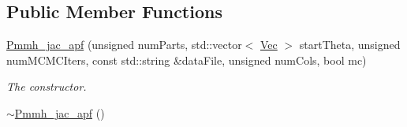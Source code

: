 \subsection*{Public Member Functions}
\begin{DoxyCompactItemize}
\item 
\hyperlink{classPmmh__jac__apf_ac195b6fc79a2d91620ceb077e752c4a8}{Pmmh\+\_\+jac\+\_\+apf} (unsigned num\+Parts, std\+::vector$<$ \hyperlink{pmfs_8h_a4c7df05c6f5e8a0d15ae14bcdbc07152}{Vec} $>$ start\+Theta, unsigned num\+M\+C\+M\+C\+Iters, const std\+::string \&data\+File, unsigned num\+Cols, bool mc)
\begin{DoxyCompactList}\small\item\em The constructor. \end{DoxyCompactList}\item 
\hyperlink{classPmmh__jac__apf_afbe2594fe7e40914ac4edc36580ebc33}{$\sim$\+Pmmh\+\_\+jac\+\_\+apf} ()\hypertarget{classPmmh__jac__apf_afbe2594fe7e40914ac4edc36580ebc33}{}\label{classPmmh__jac__apf_afbe2594fe7e40914ac4edc36580ebc33}


\end{DoxyCompactItemize}
